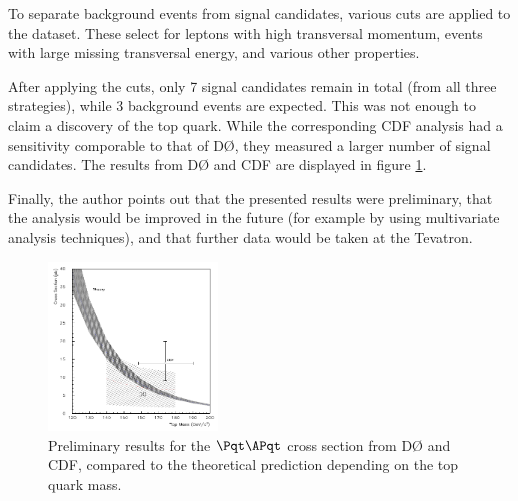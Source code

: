 To separate background events from signal candidates, various cuts are applied to the dataset.
These select for leptons with high transversal momentum, events with large missing transversal energy, and various other properties.

After applying the cuts, only 7 signal candidates remain in total (from all three strategies), while 3 background events are expected.
This was not enough to claim a discovery of the top quark.
While the corresponding CDF analysis had a sensitivity comporable to that of DØ, they measured a larger number of signal candidates\cite{cdf}.
The results from DØ and CDF are displayed in figure \ref{results}.

Finally, the author points out that the presented results were preliminary, that the analysis would be improved in the future (for example by using multivariate analysis techniques), and that further data would be taken at the Tevatron.

\begin{figure}
  \centering
  \includegraphics[width=0.4\textwidth]{figures/result.pdf}
  \caption{
    Preliminary results for the $\Pqt\APqt$ cross section from DØ and CDF, compared to the theoretical prediction depending on the top quark mass.
  }
  \label{results}
\end{figure}

\nocite{*}
\printbibliography


